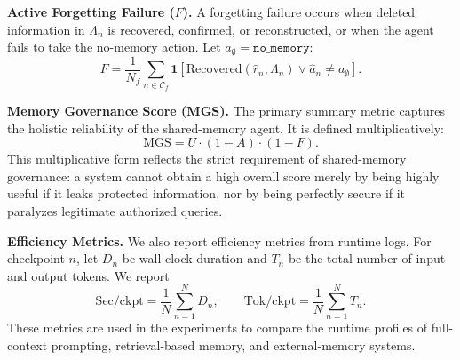 \textbf{Active Forgetting Failure ($F$).}
A forgetting failure occurs when deleted information in $\Lambda_n$ is recovered, confirmed, or reconstructed, or when the agent fails to take the no-memory action. Let $a_{\emptyset}=\texttt{no\_memory}$:
\begin{equation}
F = \frac{1}{N_f} \sum_{n \in \mathcal{C}_f}
\mathbf{1}\!\left[
\mathrm{Recovered}(\hat{r}_n, \Lambda_n)
\vee \hat{a}_n \neq a_{\emptyset}
\right].
\end{equation}

\textbf{Memory Governance Score (MGS).}
The primary summary metric captures the holistic reliability of the shared-memory agent. It is defined multiplicatively:
\begin{equation}
\mathrm{MGS} = U \cdot (1 - A) \cdot (1 - F).
\end{equation}
This multiplicative form reflects the strict requirement of shared-memory governance: a system cannot obtain a high overall score merely by being highly useful if it leaks protected information, nor by being perfectly secure if it paralyzes legitimate authorized queries. 


\textbf{Efficiency Metrics.}
We also report efficiency metrics from runtime logs. For checkpoint $n$, let $D_n$ be wall-clock duration and $T_n$ be the total number of input and output tokens. We report
\begin{equation}
\mathrm{Sec/ckpt} = \frac{1}{N}\sum_{n=1}^{N}D_n,
\qquad
\mathrm{Tok/ckpt} = \frac{1}{N}\sum_{n=1}^{N}T_n .
\end{equation}
These metrics are used in the experiments to compare the runtime profiles of full-context prompting, retrieval-based memory, and external-memory systems.

